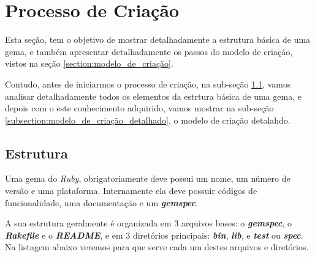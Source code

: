 \section{Processo de Criação}
\label{section:processo_de_criação}


Esta seção, tem o objetivo de mostrar detalhadamente a estrutura básica de uma gema, e também apresentar
detalhadamente os passos do modelo de criação, vistos na seção \ref{section:modelo_de_criação}.

Contudo, antes de iniciarmos o processo de criação, na sub-seção \ref{subsection:estrutura}, vamos analisar
detalhadamente todos os elementos da estrtura básica de uma gema, e depois com o este conhecimento
adquirido, vamos mostrar na sub-seção \ref{subsection:modelo_de_criação_detalhado}, o modelo de criação detalahdo.


\subsection{Estrutura}
\label{subsection:estrutura}


Uma gema do \emph{Ruby}, obrigatoriamente deve possui um nome, um número de versão e uma plataforma.
Internamente ela deve possuir códigos de funcionalidade, uma documentação e um \emph{\textbf{gemspec}}.

A sua estrutura geralmente é organizada em 3 arquivos bases: o \emph{\textbf{gemspec}}, o
\emph{\textbf{Rakefile}} e o \emph{\textbf{README}}, e em 3 diretórios principais: \emph{\textbf{bin}},
\emph{\textbf{lib}}, e \emph{\textbf{test}} ou \emph{\textbf{spec}}. Na listagem abaixo veremos para que
serve cada um destes arquivos e diretórios.

